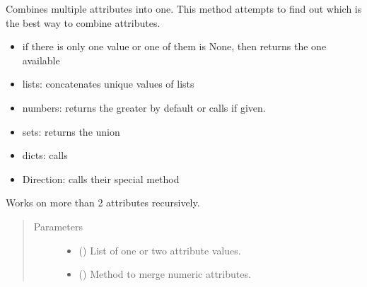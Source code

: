 \documentclass[letterpaper,10pt,english]{sphinxmanual}
\begin{document}
\begin{fulllineitems}
\begin{fulllineitems}
\end{fulllineitems}


\begin{fulllineitems}
\label{\detokenize{main:pypath.main.PyPath.combine_attr}}
Combines multiple attributes into one. This method attempts
to find out which is the best way to combine attributes.
\begin{itemize}
\item {} 
if there is only one value or one of them is None, then returns
the one available

\item {} 
lists: concatenates unique values of lists

\item {} 
numbers: returns the greater by default
or calls  if given.

\item {} 
sets: returns the union

\item {} 
dicts: calls 

\item {} 
Direction: calls their special  method

\end{itemize}

Works on more than 2 attributes recursively.
\begin{quote}\begin{description}
\item[{Parameters}] \leavevmode\begin{itemize}
\item {} 
 () \textendash{} List of one or two attribute values.

\item {} 
 () \textendash{} Method to merge numeric attributes.

\end{itemize}

\end{description}\end{quote}


\end{fulllineitems}
\end{fulllineitems}
\end{document}
